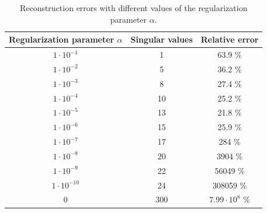 \documentclass[12pt,a4]{article}
\begin{document}
\begin{table}
\begin{center}
\begin{tabular}[t]{|c|c|c|}
\hline
Regularization parameter $\alpha$ & Singular values & Relative error
\\ \hline
$1 \cdot 10^{-1}$  &  1    & 63.9              \% \\ \hline
$1 \cdot 10^{-2}$  &  5    & 36.2              \% \\ \hline
$1 \cdot 10^{-3}$  &  8    & 27.4              \% \\ \hline
$1 \cdot 10^{-4}$  &  10   & 25.2              \% \\ \hline
$1 \cdot 10^{-5}$  &  13   & 21.8              \% \\ \hline
$1 \cdot 10^{-6}$  &  15   & 25.9              \% \\ \hline
$1 \cdot 10^{-7}$  &  17   & 284               \% \\ \hline
$1 \cdot 10^{-8}$  &  20   & 3904              \% \\ \hline
$1 \cdot 10^{-9}$  &  22   & 56049             \% \\ \hline
$1 \cdot 10^{-10}$ &  24   & 308059            \% \\ \hline
$0$                &  300  & $7.99 \cdot 10^8$ \% \\ \hline
\end{tabular}
\end{center}
\caption{Reconstruction errors with different values of the regularization parameter $\alpha$.}
\label{tab:recs}
\end{table}
\end{document}
